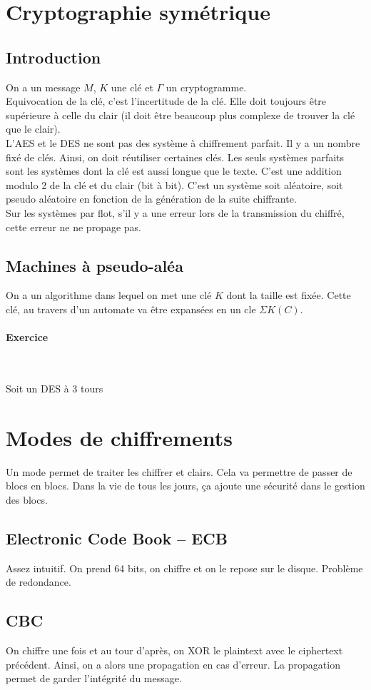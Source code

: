 \section{Cryptographie symétrique}
\subsection{Introduction}
On a un message $M$, $K$ une clé et $\Gamma$ un cryptogramme.\\
Equivocation de la clé, c'est l'incertitude de la clé. Elle doit toujours être supérieure à celle du clair (il doit être beaucoup plus complexe de trouver la clé que le clair).\\
L'AES et le DES ne sont pas des système à chiffrement parfait. Il y a un nombre fixé de clés. Ainsi, on doit réutiliser certaines clés. Les seuls systèmes parfaits sont les systèmes dont la clé est aussi longue que le texte. C'est une addition modulo 2 de la clé et du clair (bit à bit). C'est un système soit aléatoire, soit pseudo aléatoire en fonction de la génération de la suite chiffrante.\\
Sur les systèmes par flot, s'il y a une erreur lors de la transmission du chiffré, cette erreur ne ne propage pas.
\subsection{Machines à pseudo-aléa}
On a un algorithme dans lequel on met une clé $K$ dont la taille est fixée. Cette clé, au travers d'un automate va être expansées en un cle $\Sigma K(C)$.
\paragraph{Exercice}~\\\par
Soit un DES à 3 tours 
\section{Modes de chiffrements}
Un mode permet de traiter les chiffrer et clairs. Cela va permettre de passer de blocs en blocs. Dans la vie de tous les jours, ça ajoute une sécurité dans le gestion des blocs.
\subsection{Electronic Code Book -- ECB}
Assez intuitif. On prend 64 bits, on chiffre et on le repose sur le disque. Problème de redondance.
\subsection{CBC}
On chiffre une fois et au tour d'après, on XOR le plaintext avec le ciphertext précédent. Ainsi, on a alors une propagation en cas d'erreur. La propagation permet de garder l'intégrité du message.
